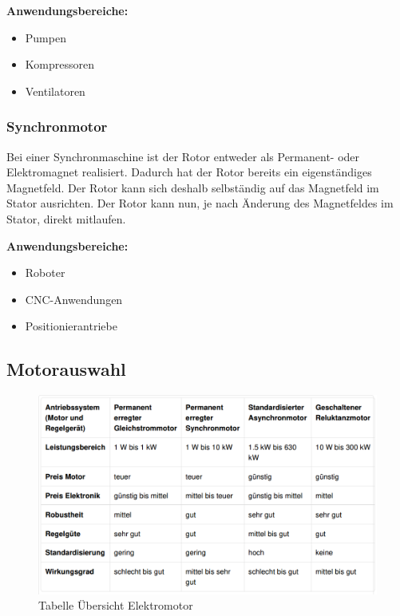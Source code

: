 \textbf{Anwendungsbereiche:}

\begin{itemize}
	\item{Pumpen}
	\item{Kompressoren}
	\item{Ventilatoren}
\end{itemize}

\subsubsection{Synchronmotor}
\label{sec:synchronmotor}

Bei einer Synchronmaschine ist der Rotor entweder als Permanent- oder Elektromagnet realisiert. Dadurch hat der Rotor bereits ein eigenständiges Magnetfeld. Der Rotor kann sich deshalb selbständig auf das Magnetfeld im Stator ausrichten. Der Rotor kann nun, je nach Änderung des Magnetfeldes im Stator, direkt mitlaufen. 

\textbf{Anwendungsbereiche:}

\begin{itemize}
	\item{Roboter}
	\item{CNC-Anwendungen}
	\item{Positionierantriebe}
\end{itemize}



\subsection{Motorauswahl}
\label{sec:motorauswahl}

\begin{figure}[!ht]
\begin{center}
	\caption{Tabelle Übersicht Elektromotor}
	\includegraphics[width=1\textwidth]{TabelleMotor}
\end{center}
\end{figure}

